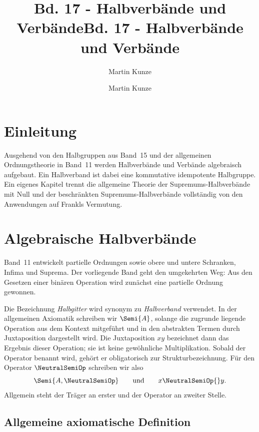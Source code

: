 \documentclass[main.tex]{subfiles}
\title{Bd. 17 - Halbverbände und Verbände}
\author{Martin Kunze}
\date{}
\begin{document}
\title{Bd. 17 - Halbverbände und Verbände}
\author{Martin Kunze}
\date{}
\hypersetup{pageanchor=false}
\maketitle
\hypersetup{pageanchor=true}
\setcounter{tocdepth}{3}
\tableofcontents
\setcounter{file}{17}
\renewcommand{\FormulaBandID}{17}
\newcommand{\ProofRefStack}[1]{%
  \ensuremath{\begin{gathered}#1\end{gathered}}}

\chapter{Einleitung}

Ausgehend von den Halbgruppen aus Band~15 und der allgemeinen Ordnungstheorie
in Band~11 werden Halbverbände und Verbände algebraisch aufgebaut. Ein
Halbverband ist dabei eine kommutative idempotente Halbgruppe. Ein eigenes
Kapitel trennt
die allgemeine Theorie der Supremums-Halbverbände mit Null und der
beschränkten Supremums-Halbverbände vollständig von den Anwendungen auf
Frankls Vermutung.

\chapter{Algebraische Halbverbände}

Band~11 entwickelt partielle Ordnungen sowie obere und untere Schranken,
Infima und Suprema. Der vorliegende Band geht den umgekehrten Weg: Aus den
Gesetzen einer binären Operation wird zunächst eine partielle Ordnung
gewonnen.

Die Bezeichnung \emph{Halbgitter} wird synonym zu \emph{Halbverband}
verwendet. In der allgemeinen Axiomatik schreiben wir \(\Semi{A}\), solange
die zugrunde liegende Operation aus dem Kontext mitgeführt und in den
abstrakten Termen durch Juxtaposition dargestellt wird. Die Juxtaposition
\(xy\) bezeichnet dann das Ergebnis dieser Operation; sie ist keine
gewöhnliche Multiplikation. Sobald der Operator benannt wird, gehört er
obligatorisch zur Strukturbezeichnung. Für den Operator \(\NeutralSemiOp\)
schreiben wir also
\[
  \Semi{A,\NeutralSemiOp}
  \qquad\text{und}\qquad
  x\NeutralSemiOp{}y.
\]
Allgemein steht der Träger an erster und der Operator an zweiter Stelle.

\section{Allgemeine axiomatische Definition}
\end{document}
